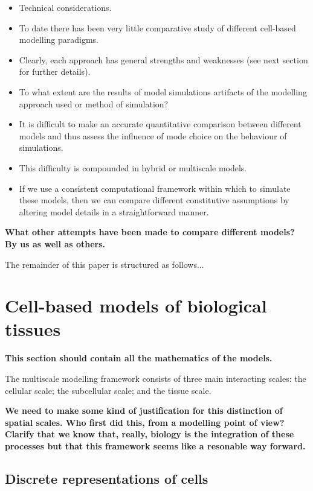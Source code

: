 \documentclass{siamltex}
\newcommand{\highlight}[1]{{\color{red} \bf{#1}}}
\begin{document}
\begin{itemize}
\item Technical considerations.
\item To date there has been very little comparative study of different cell-based modelling paradigms.
\item Clearly, each approach has general strengths and weaknesses (see next section for further details).
\item To what extent are the results of model simulations artifacts of the modelling approach used or method of simulation?
\item It is difficult to make an accurate quantitative comparison between different models and thus assess the influence of mode choice on the behaviour of simulations.
\item This difficulty is compounded in hybrid or multiscale models.
\item If we use a consistent computational framework within which to simulate these models, then we can compare different constitutive assumptions by altering model details in a straightforward manner.
\end{itemize}

\highlight{What other attempts have been made to compare different models? By us \cite{Osborne2010Hybrid} as well as others.}

The remainder of this paper is structured as follows...

\section{Cell-based models of biological tissues }\label{sec:discrete_models}
\highlight{This section should contain all the mathematics of the models.}

The multiscale modelling framework consists of three main interacting scales: the cellular scale; the subcellular scale; and the tissue scale.

\highlight{We need to make some kind of justification for this distinction of spatial scales. Who first did this, from a modelling point of view? Clarify that we know that, really, biology is the integration of these processes but that this framework seems like a resonable way forward.}

\subsection{Discrete representations of cells} \label{sec:cell_level}
\end{document}
